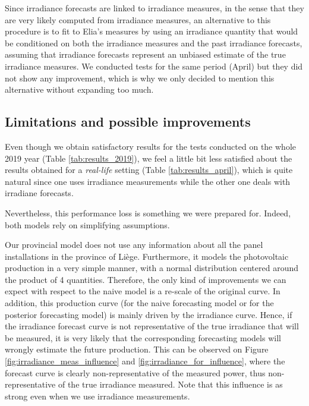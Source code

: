 \documentclass[a4paper, 12pt]{article}
\begin{document}
Since irradiance forecasts are linked to irradiance measures, in the sense that they are very likely computed from irradiance measures, an alternative to this procedure is to fit to Elia's measures by using an irradiance quantity that would be conditioned on both the irradiance measures and the past irradiance forecasts, assuming that irradiance forecasts represent an unbiased estimate of the true irradiance measures. We conducted tests for the same period (April) but they did not show any improvement, which is why we only decided to mention this alternative without expanding too much.


\subsection{Limitations and possible improvements}
\label{subsec:limitations_solar}
Even though we obtain satisfactory results for the tests conducted on the whole 2019 year (Table \ref{tab:results_2019}), we feel a little bit less satisfied about the results obtained for a \emph{real-life} setting (Table \ref{tab:results_april}), which is quite natural since one uses irradiance measurements while the other one deals with irradiane forecasts.

Nevertheless, this performance loss is something we were prepared for. Indeed, both models rely on simplifying assumptions. 

Our provincial model does not use any information about all the panel installations in the province of Liège. Furthermore, it models the photovoltaic production in a very simple manner, with a normal distribution centered around the product of 4 quantities. Therefore, the only kind of improvements we can expect with respect to the naive model is a re-scale of the original curve. In addition, this production curve (for the naive forecasting model or for the posterior forecasting model) is mainly driven by the irradiance curve. Hence, if the irradiance forecast curve is not representative of the true irradiance that will be measured, it is very likely that the corresponding forecasting models will wrongly estimate the future production. This can be observed on Figure \ref{fig:irradiance_meas_influence} and \ref{fig:irradiance_for_influence}, where the forecast curve is clearly non-representative of the measured power, thus non-representative of the true irradiance measured. Note that this influence is as strong even when we use irradiance measurements.
\end{document}
